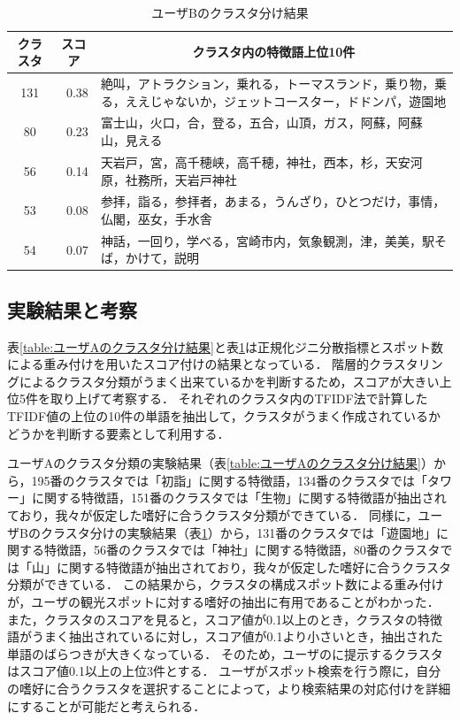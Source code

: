 \documentclass{deimj}
\begin{document}
\begin{table}[t]
    \caption{ユーザBのクラスタ分け結果}
    \label{table:ユーザBのクラスタ分け結果}
    \centering
    \begin{tabular}{c|r|l}
    \hline
    \multicolumn{1}{c|}{クラスタ} & \multicolumn{1}{c|}{スコア} & \multicolumn{1}{c}{クラスタ内の特徴語上位10件}                       \\ \hline
    131                       & 0.38                     & 絶叫，アトラクション，乗れる，トーマスランド，乗り物，乗る，ええじゃないか，ジェットコースター，ドドンパ，遊園地 \\
    80                        & 0.23                     & 富士山，火口，合，登る，五合，山頂，ガス，阿蘇，阿蘇山，見える                          \\
    56                        & 0.14                     & 天岩戸，宮，高千穂峡，高千穂，神社，西本，杉，天安河原，社務所，天岩戸神社                    \\
    53                        & 0.08                     & 参拝，詣る，参拝者，あまる，うんざり，ひとつだけ，事情，仏閣，巫女，手水舎                    \\
    54                        & 0.07                     & 神話，一回り，学べる，宮崎市内，気象観測，津，美美，駅そば，かけて，説明                     \\ \hline
    \end{tabular}
\end{table}

\subsection{実験結果と考察}
表\ref{table:ユーザAのクラスタ分け結果}と表\ref{table:ユーザBのクラスタ分け結果}は正規化ジニ分散指標とスポット数による重み付けを用いたスコア付けの結果となっている．
階層的クラスタリングによるクラスタ分類がうまく出来ているかを判断するため，スコアが大きい上位5件を取り上げて考察する．
それぞれのクラスタ内のTFIDF法で計算したTFIDF値の上位の10件の単語を抽出して，クラスタがうまく作成されているかどうかを判断する要素として利用する．

ユーザAのクラスタ分類の実験結果（表\ref{table:ユーザAのクラスタ分け結果}）から，195番のクラスタでは「初詣」に関する特徴語，134番のクラスタでは「タワー」に関する特徴語，151番のクラスタでは「生物」に関する特徴語が抽出されており，我々が仮定した嗜好に合うクラスタ分類ができている．
同様に，ユーザBのクラスタ分けの実験結果（表\ref{table:ユーザBのクラスタ分け結果}）から，131番のクラスタでは「遊園地」に関する特徴語，56番のクラスタでは「神社」に関する特徴語，80番のクラスタでは「山」に関する特徴語が抽出されており，我々が仮定した嗜好に合うクラスタ分類ができている．
この結果から，クラスタの構成スポット数による重み付けが，ユーザの観光スポットに対する嗜好の抽出に有用であることがわかった．
また，クラスタのスコアを見ると，スコア値が0.1以上のとき，クラスタの特徴語がうまく抽出されているに対し，スコア値が0.1より小さいとき，抽出された単語のばらつきが大きくなっている．
そのため，ユーザのに提示するクラスタはスコア値0.1以上の上位3件とする．
ユーザがスポット検索を行う際に，自分の嗜好に合うクラスタを選択することによって，より検索結果の対応付けを詳細にすることが可能だと考えられる．
\end{document}
